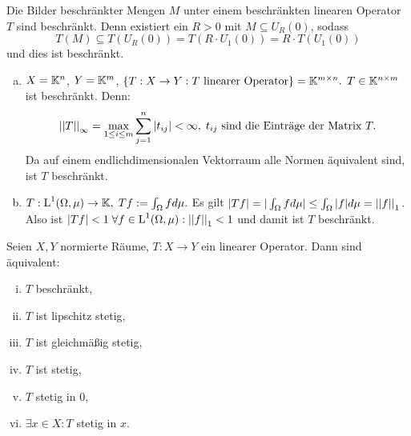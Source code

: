 \documentclass[ngerman]{report}
\begin{document}
	\begin{bem*} 
	Die Bilder beschränkter Mengen $M$ unter einem beschränkten linearen Operator $T$ sind beschränkt. Denn existiert ein $R>0$ mit $M \subseteq  U_R(0)$, sodass 
		$$T(M) \subseteq T(U_R(0))=T(R\cdot U_1(0))=R\cdot T(U_1(0))$$
		und dies ist beschränkt.
	\end{bem*}

	\begin{bsp}
		\begin{enumerate}[a)]
			\item $X = \mathbb{K}^n$, $Y = \mathbb{K}^m$, $\{T: X\to Y: T \text{ linearer Operator}\} = \mathbb{K}^{m \times n}.$ $T\in\mathbb{K}^{n \times m}$ ist beschränkt. 
			Denn: 
			$$\left\lvert \left\lvert T \right\rvert \right\rvert_\infty = \max_{1\leq i \leq m} \sum^n_{j=1} |t_{ij}| < \infty,\; t_{ij} \text{ sind die Einträge der Matrix }T.$$ Da auf einem endlichdimensionalen Vektorraum alle Normen äquivalent sind, ist $T$ beschränkt.
			\item $T: \text{L}^{1}(\Omega,\mu) \to \mathbb{K}, \; Tf := \int_\Omega f d\mu.$ 
				Es gilt $|Tf| = |\int_\Omega f d\mu| \leq \int_\Omega |f| d\mu = \left\lvert \left\lvert f \right\rvert \right\rvert_1.$
				Also ist $|Tf| < 1 \; \forall f \in \text{L}^{1}(\Omega,\mu): \left\lvert \left\lvert f \right\rvert \right\rvert_1 < 1$ und damit ist $T$ beschränkt.
		\end{enumerate}
	\end{bsp}

	\begin{thm}
		Seien $X,Y$ normierte Räume, $T: X\to Y$ ein linearer Operator. Dann sind äquivalent:
			\begin{enumerate}[(i)]
				\item $T$ beschränkt,
				\item $T$ ist lipschitz stetig,
				\item $T$ ist gleichmäßig stetig,
				\item $T$ ist stetig,
				\item $T$ stetig in $0$,
				\item $\exists x \in X: T$ stetig in $x$.
			\end{enumerate}
	\end{thm}
\end{document}
